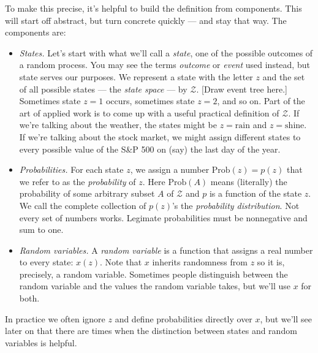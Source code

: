 \documentclass[11pt]{article}
\begin{document}
To make this precise, it's helpful to build the definition
from components.
This will start off abstract, but turn concrete quickly --- and stay that way.
The components are:
%
\begin{itemize}
\item {\it States.\/}  Let's start with what we'll call a {\it state\/},
one of the possible outcomes of a random process.
You may see the terms {\it outcome\/} or {\it event} used instead,
but state serves our purposes.
We represent a state with the letter $z$
and the set of all possible states --- the {\it state space\/} --- by $\mathcal{Z}$.
[Draw event tree here.]
Sometimes state $z=1$ occurs, sometimes state $z=2$, and so on.
Part of the art of applied work is to come up with
a useful practical definition of $\mathcal{Z}$.
If we're talking about the weather, the states might be
$z = \mbox{rain}$ and $z = \mbox{shine}$.
If we're talking about the stock market, we might assign different states to every possible value
of the S\&P 500 on (say) the last day of the year.

\item {\it Probabilities.\/}
For each state $z$, we assign a number $\mbox{Prob}(z) = p(z)$
that we refer to as the {\it probability\/} of $z$.
Here $\mbox{Prob}(A)$ means (literally) the probability of
some arbitrary subset $A$ of $\mathcal{Z}$
and $p$ is a function of the state $z$.
We call the complete collection of $p(z)$'s
the {\it probability distribution\/}.
Not every set of numbers works.
Legimate probabilities must be nonnegative and sum to one.

\item {\it Random variables.\/}
A {\it random variable\/} is a function that
assigns a real number to every state:  $x(z)$.
Note that $x$ inherits randomness from $z$ so it is, precisely,
a random variable.
Sometimes people distinguish between the random variable
and the values the random variable takes,
but we'll use $x$ for both.
\end{itemize}
%
In practice we often ignore $z$
and define probabilities directly over $x$,
but we'll see later on that there are times when the distinction
between states and random variables is helpful.
\end{document}
